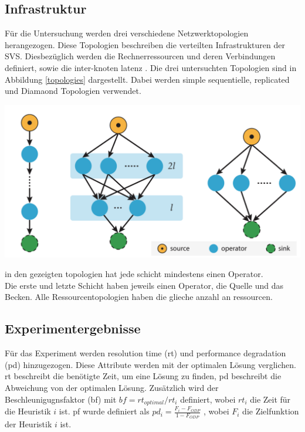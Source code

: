 \documentclass{article}
\begin{document}
\subsection{Infrastruktur}
Für die Untersuchung werden drei verschiedene Netzwerktopologien herangezogen. 
Diese Topologien beschreiben die verteilten Infrastrukturen der SVS. 
Diesbezüglich werden die Rechnerressourcen und deren Verbindungen definiert, sowie die inter-knoten latenz \cite{efficient-operator-placement}.
Die drei untersuchten Topologien sind in Abbildung \ref{topologies} dargestellt. Dabei werden simple sequentielle, replicated und Diamaond Topologien verwendet.\\

\noindent


\begin{minipage}{0.5\textwidth}
\includegraphics[width=0.75\linewidth]{topologies.png}
\label{topologies}  
\end{minipage}
\hspace{10pt}
\begin{minipage}{0.5\textwidth}
in den gezeigten topologien hat jede schicht mindestens einen Operator. \\Die erste und letzte Schicht haben jeweils einen Operator, die Quelle und das Becken. 
Alle Ressourcentopologien haben die glieche anzahl an ressourcen. 
\end{minipage}




\subsection{Experimentergebnisse}
Für das Experiment werden resolution time (rt) und performance degradation (pd) \cite{efficient-operator-placement} hinzugezogen. Diese Attribute werden mit der optimalen Lösung verglichen. 
rt beschreibt die benötigte Zeit, um eine Lösung zu finden, pd beschreibt die Abweichung von der optimalen Lösung.
Zusätzlich wird der Beschleunigugnsfaktor (bf) mit $bf = rt_{optimal} / rt_i$ definiert, wobei $rt_i$ die Zeit für die Heuristik $i$ ist. 
pf wurde definiert als $pd_i = \frac{F_i - F_{ODP}}{1 - F_{ODP}}$  \cite{efficient-operator-placement}, wobei $F_i$ die Zielfunktion der Heuristik $i$ ist. 
\end{document}
